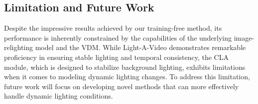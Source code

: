 \vspace{-0.5em}
\subsection{Limitation and Future Work}
\label{sec:limitation}
Despite the impressive results achieved by our training-free method,
its performance is inherently constrained by the capabilities of the underlying image-relighting model and the VDM. 
While Light-A-Video demonstrates remarkable proficiency in ensuring stable lighting and temporal consistency, 
the CLA module, which is designed to stabilize background lighting,
exhibits limitations when it comes to modeling dynamic lighting changes.
To address this limitation, future work will focus on
developing novel methods that can more effectively handle dynamic lighting conditions. 
